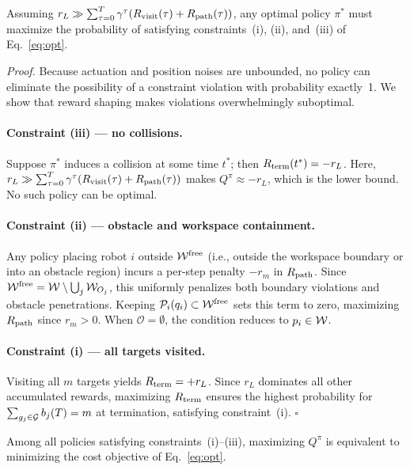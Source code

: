 \documentclass{article}
\providecommand{\obst}{\mathcal{O}}
\providecommand{\free}{\mathrm{free}}
\begin{document}
\begin{lemma}
\label{lem:const}
Assuming $r_L \gg \sum_{\tau=0}^T \gamma^\tau (R_{\mathrm{visit}}(\tau) + R_{\mathrm{path}}(\tau))$, any optimal policy $\pi^*$ must maximize the probability of satisfying constraints~\textnormal{(i)}, \textnormal{(ii)}, and~\textnormal{(iii)} of Eq.~\eqref{eq:opt}.
\end{lemma}

\textit{Proof.} Because actuation and position noises are unbounded, no policy can eliminate the possibility of a constraint violation with probability exactly~1. We show that reward shaping makes violations overwhelmingly suboptimal.

\paragraph{Constraint (iii) --- no collisions.} Suppose $\pi^*$ induces a collision at some time $t^*$; then $R_{\mathrm{term}}(t^*) = -r_L$. Here, $r_L \gg \sum_{\tau=0}^T \gamma^\tau (R_{\mathrm{visit}}(\tau) + R_{\mathrm{path}}(\tau))$ makes $Q^\pi \approx -r_L$, which is the lower bound. No such policy can be optimal.

\paragraph{Constraint (ii) --- obstacle and workspace containment.} Any policy placing robot $i$ outside $\wspace^{\free}$ (i.e., outside the workspace boundary or into an obstacle region) incurs a per-step penalty $-r_m$ in $R_{\mathrm{path}}$. Since $\wspace^{\free} = \wspace \setminus \bigcup_j \wspace_{O_j}$, this uniformly penalizes both boundary violations and obstacle penetrations. Keeping $\mathcal{P}_i(q_i) \subset \wspace^{\free}$ sets this term to zero, maximizing $R_{\mathrm{path}}$ since $r_m > 0$. When $\obst = \emptyset$, the condition reduces to $p_i \in \mathcal{W}$.

\paragraph{Constraint (i) --- all targets visited.} Visiting all $m$ targets yields $R_{\mathrm{term}} = +r_L$. Since $r_L$ dominates all other accumulated rewards, maximizing $R_{\mathrm{term}}$ ensures the highest probability for $\sum_{g_j \in \mathcal{G}} b_j(T) = m$ at termination, satisfying constraint~(i). \hfill$\square$

\begin{lemma}
\label{lem:cost}
Among all policies satisfying constraints~\textnormal{(i)--(iii)}, maximizing $Q^\pi$ is equivalent to minimizing the cost objective of Eq.~\eqref{eq:opt}.
\end{lemma}
\end{document}

